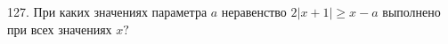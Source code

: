 127. При каких значениях параметра $a$ неравенство $2|x+1|\geqslant x-a$ выполнено при всех значениях $x?$\\

